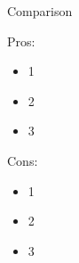 \documentclass{beamer}
\begin{document}
\begin{frame}{Comparison}
\pause
    \begin{minipage}[t]{0.48\linewidth}
        Pros:
        \begin{itemize}
            \item<3-> 1
            \item<4-> 2
            \item<5-> 3
        \end{itemize}
    \end{minipage}
    \hfill
    \begin{minipage}[t]{0.48\linewidth}%
        Cons:
        \begin{itemize}
            \item<3-> 1
            \item<4-> 2
            \item<5-> 3
        \end{itemize}
    \end{minipage}
\end{frame}
\end{document}
